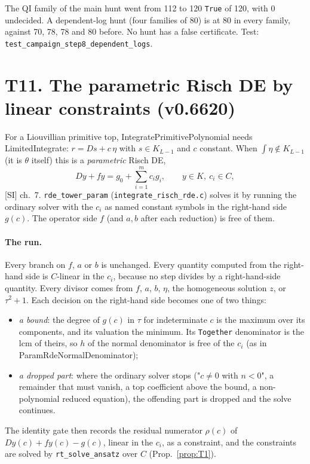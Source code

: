 \documentclass[11pt]{article}
\theoremstyle{definition}
\theoremstyle{remark}
\newcommand{\code}[1]{\texttt{#1}}
\begin{document}
The QI family of the main hunt went from 112 to 120 \code{True} of 120, with 0
undecided. A dependent-log hunt (four families of 80) is at 80 in every family, against
70, 78, 78 and 80 before. No hunt has a false certificate.
Test: \code{test\_campaign\_step8\_dependent\_logs}.

\section*{T11. The parametric Risch DE by linear constraints (v0.6620)}
\label{sec:T11}

For a Liouvillian primitive top, IntegratePrimitivePolynomial needs
LimitedIntegrate: $r=Ds+c\,\eta$ with $s\in K_{L-1}$ and $c$ constant. When
$\int\eta\notin K_{L-1}$ (it is $\theta$ itself) this is a \emph{parametric} Risch DE,
\[ Dy+fy=g_0+\sum_{i=1}^m c_ig_i,\qquad y\in K,\ c_i\in C, \tag{PRDE}\]
[SI] ch.~7. \code{rde\_tower\_param} (\code{integrate\_risch\_rde.c}) solves it by
running the ordinary solver with the $c_i$ as named constant symbols in the right-hand
side $g(c)$. The operator side $f$ (and $a,b$ after each reduction) is free of them.

\paragraph{The run.} Every branch on $f$, $a$ or $b$ is unchanged. Every quantity
computed from the right-hand side is $C$-linear in the $c_i$, because no step divides
by a right-hand-side quantity. Every divisor comes from $f$, $a$, $b$, $\eta$, the
homogeneous solution $z$, or $\tau^2+1$. Each decision on the right-hand side becomes
one of two things:
\begin{itemize}
\item \emph{a bound}: the degree of $g(c)$ in $\tau$ for indeterminate $c$ is the
  maximum over its components, and its valuation the minimum. Its \code{Together}
  denominator is the lcm of theirs, so $h$ of the normal denominator is free of the $c_i$
  (as in ParamRdeNormalDenominator);
\item \emph{a dropped part}: where the ordinary solver stops ("$c\neq0$ with $n<0$",
  a remainder that must vanish, a top coefficient above the bound, a non-polynomial
  reduced equation), the offending part is dropped and the solve continues.
\end{itemize}
The identity gate then records the residual numerator $\rho(c)$ of
$Dy(c)+fy(c)-g(c)$, linear in the $c_i$, as a constraint, and the constraints are solved
by \code{rt\_solve\_ansatz} over $C$ (Prop.~\ref{prop:T1}).
\end{document}
